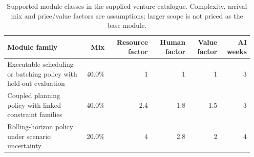 \begin{table}[!htbp]\centering\small
\caption{Supported module classes in the supplied venture catalogue. Complexity, arrival mix and price/value factors are assumptions; larger scope is not priced as the base module.}
\begin{tabularx}{\linewidth}{Yrrrrr}\toprule
Module family & Mix & Resource factor & Human factor & Value factor & AI weeks\\\midrule
Executable scheduling or batching policy with held-out evaluation & 40.0\% & 1 & 1 & 1 & 3\\
Coupled planning policy with linked constraint families & 40.0\% & 2.4 & 1.8 & 1.5 & 3\\
Rolling-horizon policy under scenario uncertainty & 20.0\% & 4 & 2.8 & 2 & 4\\
\bottomrule
\end{tabularx}
\par{}\par
\end{table}
